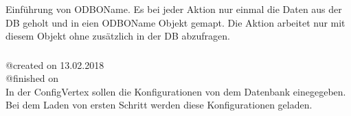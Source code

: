 \documentclass{article}
\begin{document}
Einf\"uhrung von ODBOName. Es bei jeder Aktion nur einmal die Daten aus der DB
geholt und in eien ODBOName Objekt gemapt. Die Aktion arbeitet nur mit diesem
Objekt ohne zus\"atzlich in der DB abzufragen.

\subsubsection{}
@created on 13.02.2018\\
@finished on \\

In der ConfigVertex sollen die Konfigurationen von dem Datenbank einegegeben.
Bei dem Laden von ersten Schritt werden diese Konfigurationen geladen.
\end{document}
